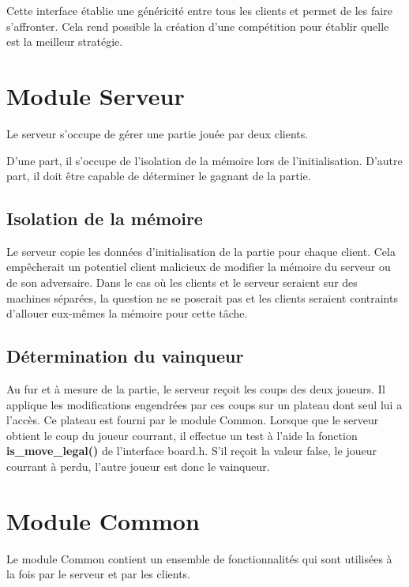 \documentclass{article}
\begin{document}
Cette interface \'etablie une g\'en\'ericit\'e entre tous les clients et permet de les faire s'affronter.
Cela rend possible la cr\'eation d'une comp\'etition pour \'etablir quelle est 
la meilleur strat\'egie.

\section{Module Serveur}

Le serveur s'occupe de g\'erer une partie jou\'ee par deux clients. 

D'une part, il s'occupe de l'isolation de la m\'emoire lors de l'initialisation.
D'autre part, il doit \^etre capable de d\'eterminer le gagnant de la partie.


\subsection{Isolation de la m\'emoire}
Le serveur copie les donn\'ees d'initialisation de la partie pour chaque client.
Cela emp\^echerait un potentiel client malicieux de modifier la m\'emoire du serveur ou 
de son adversaire.
Dans le cas o\`u les clients et le serveur seraient sur des machines s\'epar\'ees, 
la question ne se poserait pas et les clients seraient contraints
d'allouer eux-m\^emes la m\'emoire pour cette t\^ache.

\subsection{D\'etermination du vainqueur}
Au fur et \`a mesure de la partie, le serveur re\c coit les coups des deux joueurs.
Il applique les modifications engendr\'ees par ces coups sur un plateau dont seul lui a l'acc\`es.
Ce plateau est fourni par le module Common. Lorsque que le serveur obtient le coup 
du joueur courrant, il effectue un test \`a l'aide la fonction \textbf{is\_move\_legal()} de l'interface board.h.
S'il re\c coit la valeur false, le joueur courrant \`a perdu, l'autre joueur est donc le vainqueur.


\section{Module Common}
Le module Common contient un ensemble de fonctionnalit\'es qui sont 
utilis\'ees \`a la fois par le serveur et par les clients. 
\end{document}
